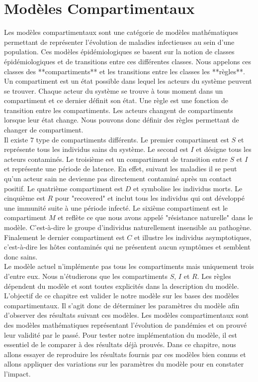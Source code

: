 \chapter{Modèles Compartimentaux} \label{ch:intro}

Les modèles compartimentaux sont une catégorie de modèles mathématiques permettant de représenter l'évolution de maladies infectieuses au sein d'une population. Ces modèles épidémiologiques se basent sur la notion de classes épidémiologiques et de transitions entre ces différentes classes. Nous appelons ces classes des **compartiments** et les transitions entre les classes les **règles**. Un compartiment est un état possible dans lequel les acteurs du système peuvent se trouver. Chaque acteur du système se trouve à tous moment dans un compartiment et ce dernier définit son état. Une règle est une fonction de transition entre les compartiments. Les acteurs changent de compartiments lorsque leur état change. Nous pouvons donc définir des règles permettant de changer de compartiment.\\

Il existe $7$ type de compartiments différents. Le premier compartiment est $S$ et représente tous les individus sains du système. Le second est $I$ et désigne tous les acteurs contaminés. Le troisième est un compartiment de transition entre $S$ et $I$ et représente une période de latence. En effet, suivant les maladies il se peut qu'un acteur sain ne devienne pas directement contaminé après un contact positif. Le quatrième compartiment est $D$ et symbolise les individus morts. Le cinquième est $R$ pour "recovered" et inclut tous les individus qui ont développé une immunité suite à une période infecté. Le sixième compartiment est le compartiment $M$ et reflète ce que nous avons appelé "résistance naturelle" dans le modèle. C'est-à-dire le groupe d'individus naturellement insensible au pathogène. Finalement le dernier compartiment est $C$ et illustre les individus asymptotiques, c'est-à-dire les hôtes contaminés qui ne présentent aucun symptômes et semblent donc sains.\\

Le modèle actuel n'implémente pas tous les compartiments mais uniquement trois d'entre eux. Nous n'étudierons que les compartiments $S$, $I$ et $R$. Les règles dépendent du modèle et sont toutes explicités dans la description du modèle.\\

L'objectif de ce chapitre est valider le notre modèle sur les bases des modèles compartimentaux. Il s'agit donc de déterminer les paramètres du modèle afin d'observer des résultats suivant ces modèles. Les modèles compartimentaux sont des modèles mathématiques représentant l'évolution de pandémies et on prouvé leur validité par le passé. Pour tester notre implémentation du modèle, il est essentiel de le comparer à des résultats déjà prouvés. Dans ce chapitre, nous allons essayer de reproduire les résultats fournis par ces modèles bien connus et allons appliquer des variations sur les paramètres du modèle pour en constater l'impact.

